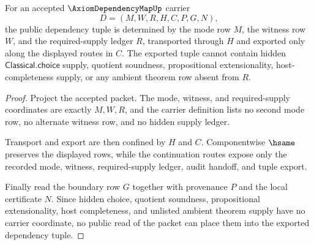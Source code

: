 \begin{theorem}
\label{thm:axiom-dependency-tuple-mode-ledger}
For an accepted $\AxiomDependencyMapUp$ carrier
$$
D=(M,W,R,H,C,P,G,N),
$$
the public dependency tuple is determined by the mode row $M$, the witness row $W$, and the required-supply ledger $R$, transported through $H$ and exported only along the displayed routes in $C$. The exported tuple cannot contain hidden $\mathsf{Classical.choice}$ supply, quotient soundness, propositional extensionality, host-completeness supply, or any ambient theorem row absent from $R$.
\end{theorem}
\begin{proof}
Project the accepted packet. The mode, witness, and required-supply coordinates are exactly $M,W,R$, and the carrier definition lists no second mode row, no alternate witness row, and no hidden supply ledger.

Transport and export are then confined by $H$ and $C$. Componentwise $\hsame$ preserves the displayed rows, while the continuation routes expose only the recorded mode, witness, required-supply ledger, audit handoff, and tuple export.

Finally read the boundary row $G$ together with provenance $P$ and the local certificate $N$. Since hidden choice, quotient soundness, propositional extensionality, host completeness, and unlisted ambient theorem supply have no carrier coordinate, no public read of the packet can place them into the exported dependency tuple.
\end{proof}
